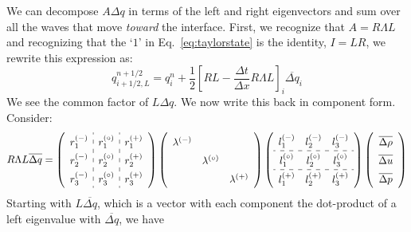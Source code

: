 We can decompose $A \Delta q$ in terms of the left and right
eigenvectors and sum over all the waves that move {\em toward} the
interface.  First, we recognize that $A = R \Lambda L$ and recognizing
that the `$1$'
in Eq.~\ref{eq:taylorstate} is the identity, $I = LR$, we rewrite this
expression as:
\begin{equation}
q_{i+1/2,L}^{n+1/2} = q_i^n +
     \frac{1}{2} \left [ RL - \frac{\Delta t}{\Delta x} R\Lambda L \right ]_i \overline{\Delta q}_i
\end{equation}
We see the common factor of $L \Delta q$.  We now write this back in
component form.  Consider:
\begin{equation}
\renewcommand{\arraystretch}{1.5}
R\Lambda L \overline{\Delta q} =
   \left ( \begin{array}{c:c:c}
             r_1^\evm & r_1^\evz & r_1^\evp \\
             r_2^\evm & r_2^\evz & r_2^\evp \\
             r_3^\evm & r_3^\evz & r_3^\evp \end{array} \right )
   \left ( \begin{array}{ccc}
             \lambda^\evm &              & \\
                          & \lambda^\evz & \\
                          &              & \lambda^\evp \end{array} \right )
   \left ( \begin{array}{ccc}
             l_1^\evm & l_2^\evm & l_3^\evm \\
             \hdashline
             l_1^\evz & l_2^\evz & l_3^\evz \\
             \hdashline
             l_1^\evp & l_2^\evp & l_3^\evp \end{array} \right )
   \left ( \begin{array}{c}
            \overline{\Delta \rho} \\
            \overline{\Delta u} \\
            \overline{\Delta p} \end{array} \right )
\renewcommand{\arraystretch}{1.0}
\end{equation}
Starting with $L \overline{\Delta q}$, which is a vector with each component
the dot-product of a left eigenvalue with $\overline{\Delta q}$, we have
